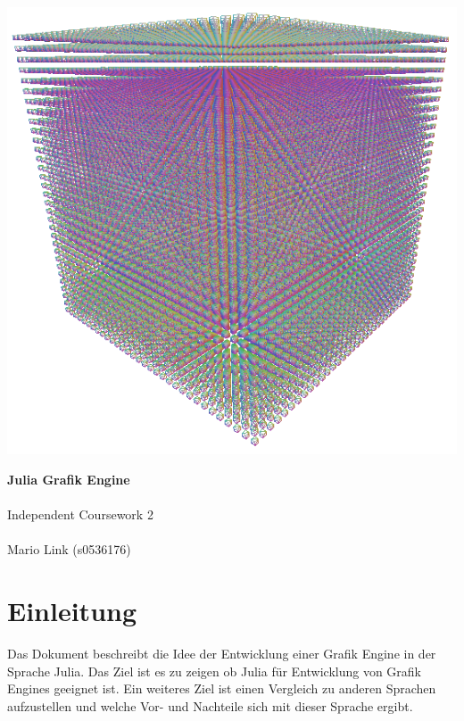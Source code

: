 \documentclass[11pt]{article}
\begin{document}
\pagecolor{page}

\vspace*{-5.0cm}
\hspace{0pt}
\vfill
\begin{center}\includegraphics[scale=1.0]{title.png}\end{center}
\vspace*{1.0cm}
{
\fontsize{30}{60}\selectfont\color{white}
\textbf{Julia Grafik Engine}\\
\vspace*{0.5cm}\\
\fontsize{25}{60}\selectfont
Independent Coursework 2\\
\vspace*{0.5cm}\\
\fontsize{20}{60}\selectfont
Mario Link (s0536176)
}
\vfill

\afterpage{\nopagecolor}
\newpage

\tableofcontents

\newpage

\maketitle

\section{Einleitung}
Das Dokument beschreibt die Idee der Entwicklung einer Grafik Engine in der Sprache Julia. Das Ziel ist es zu zeigen ob Julia für Entwicklung von Grafik Engines geeignet ist. Ein weiteres Ziel ist einen Vergleich zu anderen Sprachen aufzustellen und welche Vor- und Nachteile sich mit dieser Sprache ergibt.
\end{document}
